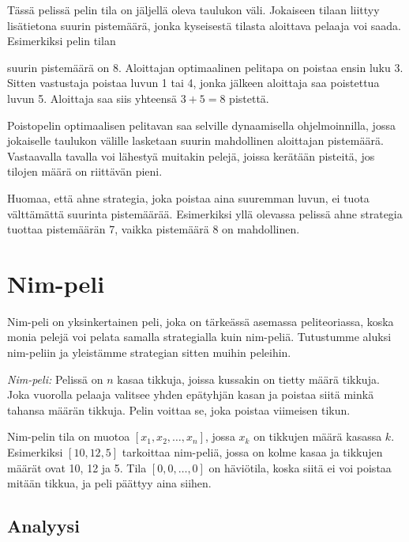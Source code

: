 Tässä pelissä pelin tila on jäljellä oleva
taulukon väli. Jokaiseen tilaan liittyy
lisätietona suurin
pistemäärä, jonka kyseisestä tilasta aloittava pelaaja
voi saada. Esimerkiksi pelin tilan
\begin{center}
\end{center}
suurin pistemäärä on 8.
Aloittajan optimaalinen pelitapa on poistaa ensin luku 3.
Sitten vastustaja poistaa luvun 1 tai 4,
jonka jälkeen aloittaja saa poistettua luvun 5.
Aloittaja saa siis yhteensä $3+5=8$ pistettä.

Poistopelin optimaalisen pelitavan saa selville
dynaamisella ohjelmoinnilla, jossa jokaiselle
taulukon välille lasketaan suurin mahdollinen
aloittajan pistemäärä.
Vastaavalla tavalla voi lähestyä muitakin
pelejä, joissa kerätään pisteitä,
jos tilojen määrä on riittävän pieni.

Huomaa, että ahne strategia, joka poistaa aina
suuremman luvun, ei tuota välttämättä suurinta
pistemäärää. Esimerkiksi yllä olevassa pelissä
ahne strategia tuottaa pistemäärän 7,
vaikka pistemäärä 8 on mahdollinen.

\section{Nim-peli}

Nim-peli on yksinkertainen peli,
joka on tärkeässä asemassa peliteoriassa,
koska monia pelejä voi pelata samalla
strategialla kuin nim-peliä.
Tutustumme aluksi nim-peliin ja yleistämme
strategian sitten muihin peleihin.

\textit{Nim-peli:} Pelissä on $n$ kasaa tikkuja,
joissa kussakin on tietty määrä tikkuja.
Joka vuorolla pelaaja valitsee yhden epätyhjän kasan
ja poistaa siitä minkä tahansa määrän tikkuja.
Pelin voittaa se, joka poistaa viimeisen tikun.

Nim-pelin tila on muotoa $[x_1,x_2,\ldots,x_n]$,
jossa $x_k$ on tikkujen määrä kasassa $k$.
Esimerkiksi $[10,12,5]$ tarkoittaa nim-peliä,
jossa on kolme kasaa ja tikkujen määrät ovat 10, 12 ja 5.
Tila $[0,0,\ldots,0]$ on häviötila,
koska siitä ei voi poistaa mitään tikkua,
ja peli päättyy aina siihen.

\subsection{Analyysi}

